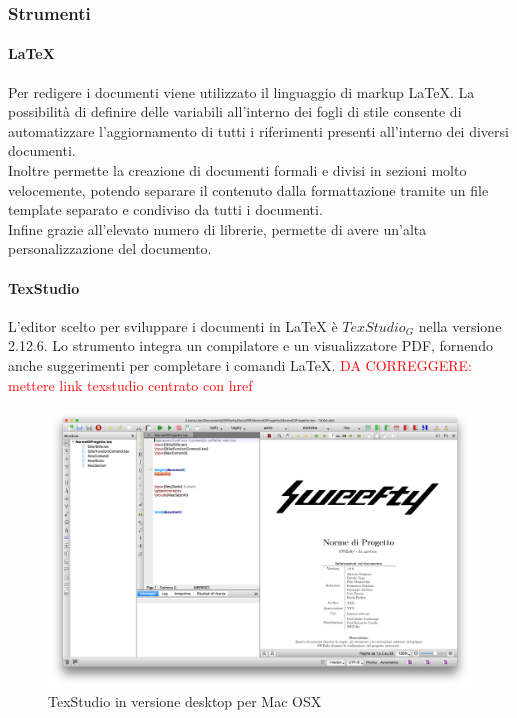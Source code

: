 	\subsubsection{Strumenti}
		\paragraph{\LaTeX}\Spazio
		Per redigere i documenti viene utilizzato il linguaggio di markup \LaTeX. La possibilità di definire delle variabili all'interno dei fogli di stile consente di automatizzare l'aggiornamento di tutti i riferimenti presenti all'interno dei diversi documenti.\\
		Inoltre permette la creazione di documenti formali e divisi in sezioni molto velocemente, potendo separare il contenuto dalla formattazione tramite un file template separato e condiviso da tutti i documenti.\\
		Infine grazie all'elevato numero di librerie, permette di avere un'alta personalizzazione del documento.
		\paragraph{TexStudio}\Spazio
		L'editor scelto per sviluppare i documenti in \LaTeX\text{ } è\text{ } $TexStudio_G$ nella versione 2.12.6. 
		Lo strumento integra un compilatore e un visualizzatore PDF, fornendo anche suggerimenti per completare i comandi \LaTeX.
		\newline
		\textcolor{red}{DA CORREGGERE: mettere link texstudio centrato con href}
		\begin{figure}[H]
				\centering
				\includegraphics[width=1\textwidth]{Images/texstudio.png}
				\caption{TexStudio in versione desktop per Mac OSX}
			\end{figure}
			
